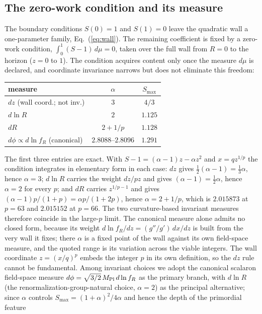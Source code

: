 \documentclass[aps,prd,twocolumn,superscriptaddress,nofootinbib,longbibliography]{revtex4-2}
\newcommand{\Mpl}{M_{\rm Pl}}
\begin{document}
\subsection{The zero-work condition and its measure}
\label{sec:measure}
The boundary conditions $S(0)=1$ and $S(1)=0$ leave the quadratic wall a
one-parameter family, Eq.~(\ref{eq:wall}). The remaining coefficient is fixed
by a zero-work condition, $\int_{0}^{1}(S-1)\,d\mu=0$, taken over the full
wall from $R=0$ to the horizon ($z=0$ to $1$). The condition acquires content only once
the measure $d\mu$ is declared, and coordinate invariance narrows
but does not eliminate this freedom:
\begin{center}
\small
\setlength{\tabcolsep}{4pt}
\begin{tabular}{lcc}
\hline
measure & $\alpha$ & $S_{\max}$ \\
\hline
$dz$ (wall coord.; not inv.) & $3$ & $4/3$ \\
$d\ln R$ & $2$ & $1.125$ \\
$dR$ & $2+1/p$ & $1.128$ \\
$d\phi\propto d\ln f_R$ (canonical) & $2.8088$--$2.8096$ & $1.291$ \\
\hline
\end{tabular}
\end{center}
The first three entries are exact. With $S-1=(\alpha-1)z-\alpha z^2$ and
$x=qz^{1/p}$ the condition integrates in elementary form in each case: $dz$
gives $\tfrac12(\alpha-1)=\tfrac13\alpha$, hence $\alpha=3$; $d\ln R$ carries
the weight $dz/pz$ and gives $(\alpha-1)=\tfrac12\alpha$, hence $\alpha=2$
for every $p$; and $dR$ carries $z^{1/p-1}$ and gives
$(\alpha-1)p/(1+p)=\alpha p/(1+2p)$, hence $\alpha=2+1/p$, which is
$2.015873$ at $p=63$ and $2.015152$ at $p=66$. The two curvature-based
invariant measures therefore coincide in the large-$p$ limit. The canonical
measure alone admits no closed form, because its weight
$d\ln f_R/dz=(g''/g')\,dx/dz$ is built from the very wall it fixes; there
$\alpha$ is a fixed point of the wall against its own field-space measure,
and the quoted range is its variation across the viable integers.
The wall coordinate $z=(x/q)^p$ embeds the integer $p$ in its own definition,
so the $dz$ rule cannot be fundamental. Among invariant choices we adopt the
canonical scalaron field-space measure $d\phi=\sqrt{3/2}\,\Mpl\,d\ln f_R$ as
the primary branch, with $d\ln R$ (the renormalization-group-natural choice,
$\alpha=2$) as the principal alternative; since $\alpha$ controls
$S_{\max}=(1+\alpha)^2/4\alpha$ and hence the depth of the primordial feature
\end{document}
